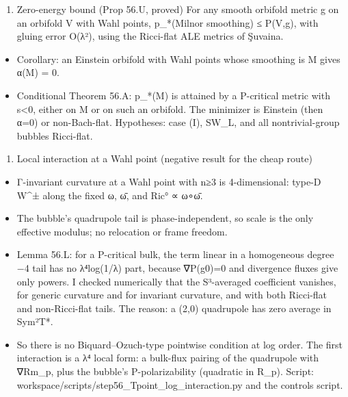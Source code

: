 \documentclass[
  10pt,
]{report}
\providecommand{\tightlist}{%
  \setlength{\itemsep}{0pt}\setlength{\parskip}{0pt}}
\begin{document}
\begin{enumerate}
\def\labelenumi{\arabic{enumi}.}
\setcounter{enumi}{2}
\tightlist
\item
  Zero-energy bound (Prop 56.U, proved) For any smooth orbifold metric g
  on an orbifold V with Wahl points, p\_*(Milnor smoothing) ≤ P(V,g),
  with gluing error O(λ²), using the Ricci-flat ALE metrics of Şuvaina.
\end{enumerate}

\begin{itemize}
\tightlist
\item
  Corollary: an Einstein orbifold with Wahl points whose smoothing is M
  gives α(M) = 0.
\item
  Conditional Theorem 56.A: p\_*(M) is attained by a P-critical metric
  with s\textless0, either on M or on such an orbifold. The minimizer is
  Einstein (then α=0) or non-Bach-flat. Hypotheses: case (I), SW\_L, and
  all nontrivial-group bubbles Ricci-flat.
\end{itemize}

\begin{enumerate}
\def\labelenumi{\arabic{enumi}.}
\setcounter{enumi}{3}
\tightlist
\item
  Local interaction at a Wahl point (negative result for the cheap
  route)
\end{enumerate}

\begin{itemize}
\tightlist
\item
  Γ-invariant curvature at a Wahl point with n≥3 is 4-dimensional:
  type-D W\^{}± along the fixed ω, ω̄, and Ric° ∝ ω∘ω̄.
\item
  The bubble's quadrupole tail is phase-independent, so scale is the
  only effective modulus; no relocation or frame freedom.
\item
  Lemma 56.L: for a P-critical bulk, the term linear in a homogeneous
  degree −4 tail has no λ⁴log(1/λ) part, because ∇P(g0)=0 and divergence
  fluxes give only powers. I checked numerically that the S³-averaged
  coefficient vanishes, for generic curvature and for invariant
  curvature, and with both Ricci-flat and non-Ricci-flat tails. The
  reason: a (2,0) quadrupole has zero average in Sym²T*.
\item
  So there is no Biquard--Ozuch-type pointwise condition at log order.
  The first interaction is a λ⁴ local form: a bulk-flux pairing of the
  quadrupole with ∇Rm\_p, plus the bubble's P-polarizability (quadratic
  in R\_p). Script:
  workspace/scripts/step56\_Tpoint\_log\_interaction.py and the controls
  script.
\end{itemize}
\end{document}
